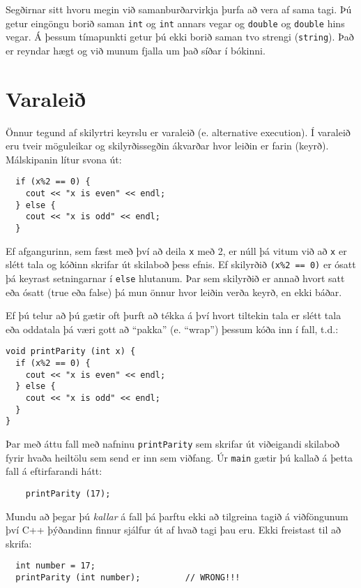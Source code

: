 Segðirnar sitt hvoru megin við samanburðarvirkja þurfa að vera af sama tagi.
Þú getur eingöngu borið saman {\tt int} og {\tt int} annars vegar og {\tt double} og {\tt double} hins vegar.
Á þessum tímapunkti getur þú ekki borið saman tvo strengi ({\tt string}).
Það er reyndar hægt og við munum fjalla um það síðar í bókinni.

\section {Varaleið}
\label{alternative}

Önnur tegund af skilyrtri keyrslu er varaleið (e. alternative execution).
Í varaleið eru tveir möguleikar og skilyrðissegðin ákvarðar hvor leiðin er farin (keyrð).
Málskipanin lítur svona út:

\begin{verbatim}
  if (x%2 == 0) {
    cout << "x is even" << endl;
  } else {
    cout << "x is odd" << endl;
  }
\end{verbatim}
%
Ef afgangurinn, sem fæst með því að deila {\tt x} með 2, er núll þá vitum við að {\tt x} er slétt tala og kóðinn skrifar út skilaboð þess efnis.
Ef skilyrðið {\tt (x\%2 == 0)} er ósatt þá keyrast setningarnar í {\tt else} hlutanum. 
Þar sem skilyrðið er annað hvort satt eða ósatt (true eða false) þá mun önnur hvor leiðin verða keyrð, en ekki báðar.

Ef þú telur að þú gætir oft þurft að tékka á því hvort tiltekin tala er slétt tala eða oddatala þá væri gott að ``pakka'' (e. ``wrap'') þessum kóða inn í fall, t.d.:

\begin{verbatim}
void printParity (int x) {
  if (x%2 == 0) {
    cout << "x is even" << endl;
  } else {
    cout << "x is odd" << endl;
  }
}
\end{verbatim}
%
Þar með áttu fall með nafninu {\tt printParity} sem skrifar út viðeigandi skilaboð fyrir hvaða heiltölu sem send er inn sem viðfang.
Úr {\tt main} gætir þú kallað á þetta fall á eftirfarandi hátt:

\begin{verbatim}
    printParity (17);
\end{verbatim}
%
Mundu að þegar þú {\em kallar} á fall þá þarftu ekki að tilgreina tagið á viðföngunum því C++ þýðandinn finnur sjálfur út af hvað tagi þau eru.
Ekki freistast til að skrifa:

\begin{verbatim}
  int number = 17;
  printParity (int number);         // WRONG!!!
\end{verbatim}

